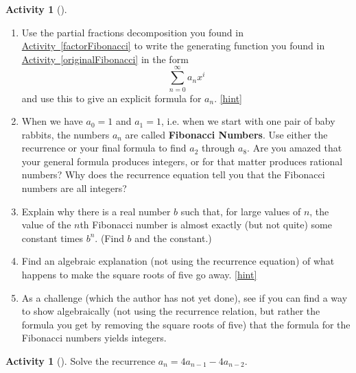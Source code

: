 \documentclass[10pt,]{book}
\newcommand{\terminology}[1]{\textbf{#1}}
\theoremstyle{plain}
\theoremstyle{definition}
\theoremstyle{definition}
\theoremstyle{definition}
\newtheorem{activity}[project]{Activity}
\numberwithin{equation}{chapter}
\begin{document}
\begin{activity}[]\label{solveFibonacci}
\leavevmode%
\begin{enumerate}[font=\bfseries,label=(\alph*),ref=\alph*]
\item\label{task-247} \hypertarget{p-1370}{}%
Use the partial fractions decomposition you found in \hyperref[factorFibonacci]{Activity~\ref{factorFibonacci}} to write the generating function you found in \hyperref[originalFibonacci]{Activity~\ref{originalFibonacci}} in the form%
\begin{equation*}
\sum_{n=0}^\infty a_nx^i
\end{equation*}
and use this to give an explicit formula for \(a_n\).%
\hfill{\tiny\hyperlink{a-269.a}{[hint]}\hypertarget{q-269.a}{}}\item\label{task-248} \hypertarget{p-1373}{}%
When we have \(a_0=1\) and \(a_1=1\), i.e. when we start with one pair of baby rabbits, the numbers \(a_n\) are called \terminology{Fibonacci Numbers}.  Use either the recurrence or your final formula to find \(a_2\) through \(a_8\).  Are you amazed that your general formula produces integers, or for that matter produces rational numbers?  Why does the recurrence equation tell you that the Fibonacci numbers are all integers?%
\item\label{task-249} \hypertarget{p-1375}{}%
Explain why there is a real number \(b\) such that, for large values of \(n\), the value of the \(n\)th Fibonacci number is almost exactly (but not quite) some constant times \(b^n\). (Find \(b\) and the constant.)%
\item\label{task-250} \hypertarget{p-1377}{}%
Find an algebraic explanation (not using the recurrence equation) of what happens to make the square roots of five go away.%
\hfill{\tiny\hyperlink{a-269.d}{[hint]}\hypertarget{q-269.d}{}}\item\label{task-251} \hypertarget{p-1380}{}%
As a challenge (which the author has not yet done), see if you can find a way to show algebraically (not using the recurrence relation, but rather the formula you get by removing the square roots of five) that the formula for the Fibonacci numbers yields integers.%
\end{enumerate}
\end{activity}
\begin{activity}[]\label{activity-263}
\hypertarget{p-1382}{}%
Solve the recurrence \(a_n= 4a_{n-1} - 4a_{n-2}\).%
\end{activity}
\typeout{************************************************}
\typeout{************************************************}
\end{document}

